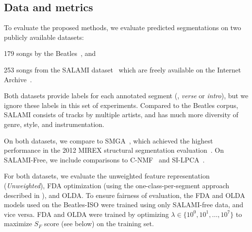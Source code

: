 \documentclass{article}
\begin{document}
\subsection{Data and metrics}
To evaluate the proposed methods, we evaluate predicted segmentations on two publicly available datasets:
\begin{description}\addtolength{\itemsep}{-0.25\baselineskip}%
\item[Beatles-ISO] 179 songs by the Beatles~\cite{harte2010towards,isophonicsbeatles}, and
\item[SALAMI-free] 253 songs from the SALAMI dataset~\cite{smith2011design} which are freely available on the 
Internet Archive~\cite{nieto2013convex}.
\end{description}
Both datasets provide labels for each annotated segment (\eg, \emph{verse} or \emph{intro}), but we ignore these
labels in this set of experiments. Compared to the Beatles corpus, SALAMI consists of tracks by multiple artists, 
and has much more diversity of genre, style, and instrumentation.

On both datasets, we compare to SMGA~\cite{serra2012unsupervised}, which achieved the
highest performance in the 2012 MIREX structural segmentation evaluation~\cite{Downie2008}.
On SALAMI-Free, we include comparisons to C-NMF~\cite{nieto2013convex} and SI-LPCA~\cite{weiss2011unsupervised}.

For both datasets, we evaluate the unweighted feature representation (\emph{Unweighted}), FDA optimization (using the
one-class-per-segment approach described in ), and OLDA.\@
To ensure fairness of evaluation, the FDA and OLDA models used on the Beatles-ISO were trained using only
SALAMI-free data, and vice versa.  FDA and OLDA were trained by optimizing $\lambda \in \{10^0, 10^1, \dots, 10^7\}$
to maximize $S_F$ score (see below) on the training set.
\end{document}
